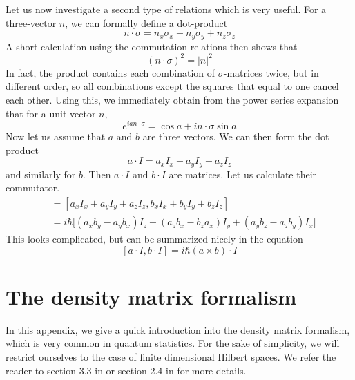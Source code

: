 \documentclass[a4paper, draft]{article}
\theoremstyle{own}
\theoremstyle{remark}
\begin{document}
Let us now investigate a second type of relations which is very useful. For a three-vector $n$, we can formally define a dot-product
$$
n \cdot \sigma = n_x \sigma_x + n_y \sigma_y + n_z \sigma_z
$$
A short calculation using the commutation relations then shows that 
$$
(n \cdot \sigma)^2 = |n|^2
$$
In fact, the product contains each combination of $\sigma$-matrices twice, but in different order, so all combinations except the squares that equal to one cancel each other. Using this, we immediately obtain from the power series expansion that for a unit vector $n$, 
$$
e^{ia n \cdot \sigma} = \cos a + i n \cdot \sigma \sin a 
$$
Now let us assume that $a$ and $b$ are three vectors. We can then form the dot product
$$
a \cdot I = a_x I_x + a_y I_y + a_z I_z
$$
and similarly for $b$. Then $a \cdot I$ and $b \cdot I$ are matrices. Let us calculate their commutator.
\begin{align*}
[a \cdot I, b \cdot I ] &= [a_x I_x + a_y I_y + a_z I_z, b_x I_x + b_y I_y + b_z I_z] \\
&= i \hbar \big[ 
 (a_x b_y - a_y b_x) I_z + (a_z b_x - b_z a_x) I_y + (a_y b_z - a_z b_y) I_x
\big] 
\end{align*}
This looks complicated, but can be summarized nicely in the equation
$$
[a \cdot I, b \cdot I ] = i \hbar (a \times b) \cdot I
$$

\section{The density matrix formalism}\label{app:densitymatrix}

In this appendix, we give a quick introduction into the density matrix formalism, which is very common in quantum statistics. For the sake of simplicity, we will restrict ourselves to the case of finite dimensional Hilbert spaces. We refer the reader to section 3.3 in \cite{WeinbergQM} or section 2.4 in \cite{NielsenChuang} for more details. 
\end{document}
